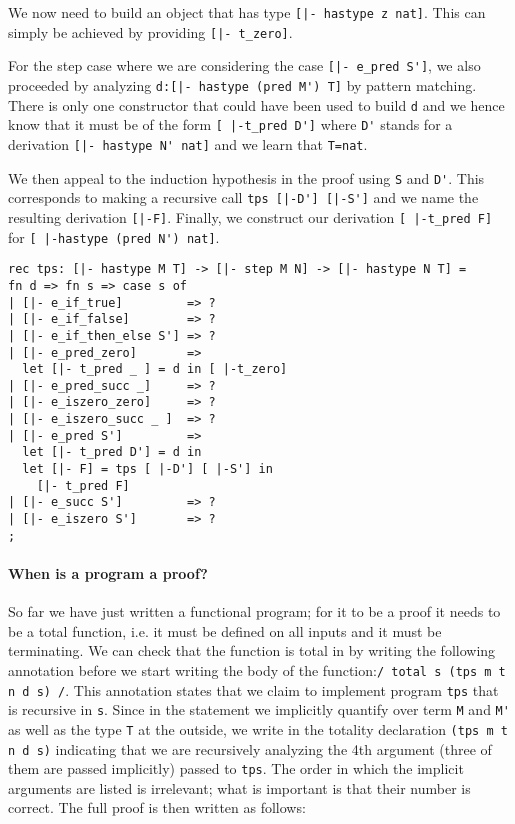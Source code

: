 We now need to build an object that has type \lstinline![|- hastype z nat]!.
This can simply be achieved by providing \lstinline![|- t_zero]!.

For the step case where we are considering the case \lstinline![|- e_pred S']!,
we also proceeded by analyzing \lstinline!d:[|- hastype (pred M') T]! by pattern
matching. There is only one constructor that could have been used to build
\lstinline!d! and we hence know that it must be of the form
\lstinline![ |-t_pred D']! where \lstinline!D'! stands for a derivation
\lstinline![|- hastype N' nat]! and we learn that \lstinline!T=nat!.

We then appeal to the induction hypothesis in the proof using \lstinline!S!
and \lstinline!D'!. This corresponds to making a recursive call
\lstinline!tps [|-D'] [|-S']! and we name the resulting derivation
\lstinline![|-F]!. Finally, we construct our derivation
\lstinline![ |-t_pred F]! for \lstinline![ |-hastype (pred N') nat]!.

\begin{lstlisting}
rec tps: [|- hastype M T] -> [|- step M N] -> [|- hastype N T] =
fn d => fn s => case s of
| [|- e_if_true]         => ?
| [|- e_if_false]        => ?
| [|- e_if_then_else S'] => ?
| [|- e_pred_zero]       =>
  let [|- t_pred _ ] = d in [ |-t_zero]
| [|- e_pred_succ _]     => ?
| [|- e_iszero_zero]     => ?
| [|- e_iszero_succ _ ]  => ?
| [|- e_pred S']         =>
  let [|- t_pred D'] = d in
  let [|- F] = tps [ |-D'] [ |-S'] in
    [|- t_pred F]
| [|- e_succ S']         => ?
| [|- e_iszero S']       => ?
;
\end{lstlisting}

\paragraph{When is a program a proof?} So far we have just written a functional
program; for it to be a proof it needs to be a total function, i.e. it must be
defined on all inputs and it must be terminating. We can check that the function
is total in \beluga by writing the following annotation before we start writing
the body of the function:\lstinline!/ total s (tps m t n d s) /!. This
annotation states that we claim to implement program \lstinline!tps! that is
recursive in \lstinline!s!. Since in the statement we implicitly quantify over
term \lstinline!M! and \lstinline!M'! as well as the type \lstinline!T! at the
outside, we write in the totality declaration
\lstinline!(tps m t n d s)! indicating that we are recursively analyzing the 4th
argument (three of them are passed implicitly) passed to \lstinline!tps!. The
order in which the implicit arguments are listed is irrelevant; what is
important is that their number is correct. The full proof is then written as
follows:

